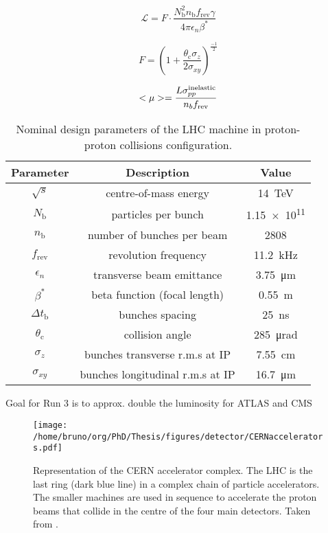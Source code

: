 \documentclass[11pt]{article}
\begin{document}
\begin{equation}
\label{eq:inst_lumi}
\mathcal{L} = F \cdot \frac{N_{\text{b}}^2 n_{\text{b}} f_{\text{rev}} \gamma}{4\pi \epsilon_n \beta^*}
\end{equation}

\begin{equation}
\label{eq:lumi_form_fact}
F = \left( 1 + \frac{\theta_{\text{c}}\sigma_z}{2\sigma_{xy}} \right)^{\frac{-1}{2}}
\end{equation}

\begin{equation}
\label{pileup}
<\mu> = \frac{L\sigma_{pp}^{\rm inelastic}}{n_bf_{\rm rev}}
\end{equation}

\begin{table}[!h]
\centering
\begin{tabular}{c|c|c}
Parameter & Description & Value\\
\hline
\(\sqrt{s}\) & centre-of-mass energy & \SI{14}{\TeV}\\
\(N_{\text{b}}\) & particles per bunch & \num{1.15e11}\\
\(n_{\text{b}}\) & number of bunches per beam & \num{2808}\\
\(f_{\text{rev}}\) & revolution frequency & \SI{11.2}{\kilo\hertz}\\
\(\epsilon_n\) & transverse beam emittance & \SI{3.75}{\micro\meter}\\
\(\beta^*\) & beta function (focal length) & \SI{0.55}{\meter}\\
\(\Delta t_{\text{b}}\) & bunches spacing & \SI{25}{\nano\second}\\
\(\theta_{\text{c}}\) & collision angle & \SI{285}{\micro\radian}\\
\(\sigma_z\) & bunches transverse r.m.s at IP & \SI{7.55}{\cm}\\
\(\sigma_{xy}\) & bunches longitudinal r.m.s at IP & \SI{16.7}{\micro\meter}\\
\end{tabular}
\caption{\label{tab:LHCparameters}Nominal design parameters of the LHC machine in proton-proton collisions configuration.}

\end{table}

Goal for Run 3 is to approx. double the luminosity for ATLAS and CMS

\begin{figure}
\texttt{[image: /home/bruno/org/PhD/Thesis/figures/detector/CERNaccelerators.pdf]}
\caption{\label{fig:econt_algorithms}Representation of the CERN accelerator complex. The LHC is the last ring (dark blue line) in a complex chain of particle accelerators. The smaller machines are used in sequence to accelerate the proton beams that collide in the centre of the four main detectors. Taken from \cite{lhc_complex}.}
\end{figure}
\end{document}
